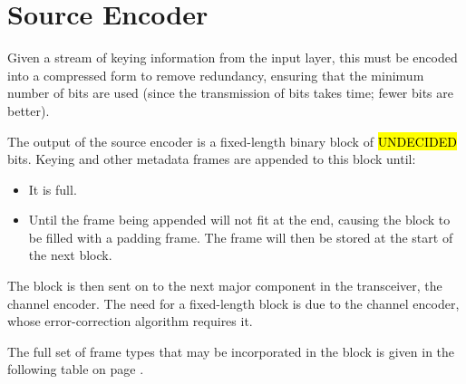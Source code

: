 \documentclass[a4paper]{tufte-handout}
\begin{document}
\section{Source Encoder}
Given a stream of keying information from the input layer, this must be encoded into a compressed form to remove redundancy, ensuring that the minimum number of bits are used (since the transmission of bits takes time; fewer bits are better).

The output of the source encoder is a fixed-length binary block of \hl{UNDECIDED} bits. Keying and other metadata frames are appended to this block until:
\begin{itemize}
    \setlength\itemsep{-0.5em}
	\item It is full.
	\item Until the frame being appended will not fit at the end, causing the block to be filled with a padding frame. The frame will then be stored at the start of the next block.
\end{itemize}
The block is then sent on to the next major component in the transceiver, the channel encoder.
The need for a fixed-length block is due to the channel encoder, whose error-correction algorithm requires it.

The full set of frame types that may be incorporated in the block is given in the following table on page \pageref{table:frame-types}.
\end{document}
